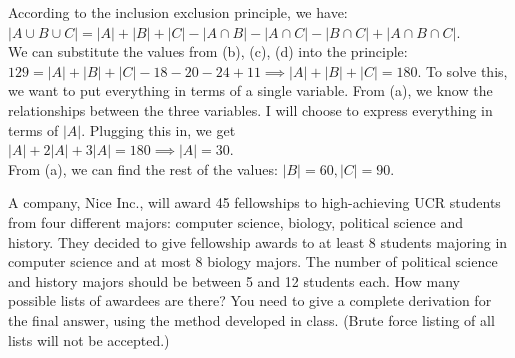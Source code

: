 \documentclass[11pt]{article}
\begin{document}
\begin{solution}
	According to the inclusion exclusion principle, we have: \\ $|A \cup B \cup C| = |A| + |B| + |C| - |A \cap B| - |A \cap C| - |B \cap C| + |A \cap B \cap C|$.
   \\
   We can substitute the values from (b), (c), (d) into the principle:
   \\
   $129 = |A| + |B| + |C| - 18 - 20 - 24 + 11 \implies |A| + |B| + |C| = 180$. To solve this, we want to put everything in terms of a single variable. From (a), we know the relationships between the three variables. I will choose to express everything in terms of $|A|$. Plugging this in, we get 
   \\ 
   $|A| +  2|A| + 3|A| = 180 \implies |A| = 30$. 
   \\ 
   From (a), we can find the rest of the values: $|B| = 60, |C| = 90$.

\end{solution}

\newpage

\begin{problem}
	A company, Nice Inc., will award 45 fellowships to high-achieving UCR students from four different majors: computer science, biology, political science and history. They decided to give fellowship awards to at least 8 students majoring in computer science and at most 8 biology majors. The number of political science and history majors should be between 5 and 12 students each. How many possible lists of awardees are there? You need to give a complete derivation for the final answer, using the method developed in class. 
	(Brute force listing of all lists will not be accepted.)
	
\end{problem}
	

\end{document}
